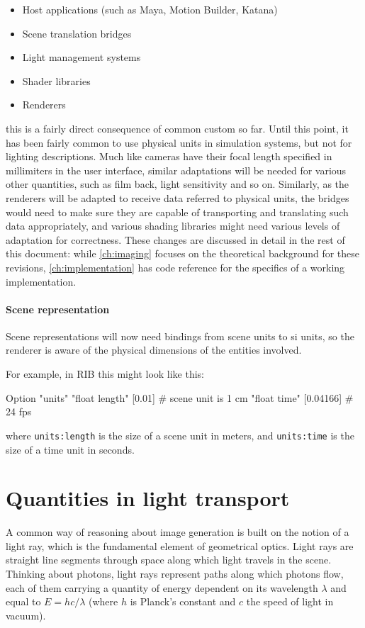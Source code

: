 \begin{itemize}
\item Host applications (such as Maya, Motion Builder, Katana)
\item Scene translation bridges
\item Light management systems
\item Shader libraries
\item Renderers
\end{itemize}
this is a fairly direct consequence of common custom so far. Until this point, it has been
fairly common to use physical units in simulation systems, but not for lighting descriptions.
Much like cameras have their focal length specified in millimiters in the user interface,
similar adaptations will be needed for various other quantities, such as film back, light 
sensitivity and so on. Similarly, as the renderers will be adapted to receive data
referred to physical units, the bridges would need to make sure they are capable of transporting
and translating such data appropriately, and various shading libraries might need various levels
of adaptation for correctness. These changes are discussed in detail in the rest of this document:
while \cref{ch:imaging} focuses on the theoretical background for these revisions,
\cref{ch:implementation} has code reference for the specifics of a working implementation.

\paragraph{Scene representation}

Scene representations will now need bindings from scene units to \gls{si} units,
so the renderer is aware of the physical dimensions of the entities involved.

For example, in \gls{RIB} this might look like this:

\begin{ribcode}
Option "units" "float length" [0.01]    # scene unit is 1 cm
               "float time"   [0.04166] # 24 fps
\end{ribcode}
where \Verb/units:length/ is the size of a scene unit in meters,
and \Verb/units:time/ is the size of a time unit in seconds.

\section{Quantities in light transport}

A common way of reasoning about image generation is built on the notion of a
light ray, which is the fundamental element of geometrical optics. Light rays
are straight line segments through space along which light travels in the scene.
Thinking about photons, light rays represent paths along which photons flow,
each of them carrying a quantity of energy dependent on its wavelength $\lambda$
and equal to $E = hc/\lambda$ (where $h$ is Planck's constant and $c$ the speed
of light in vacuum).

